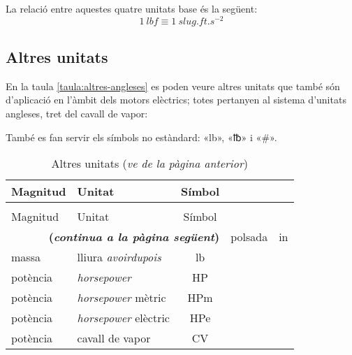 La relació entre aquestes quatre unitats base és la següent:
\begin{equation}
    \qty{1}{lbf} \equiv \qty{1}{slug.ft.s^{-2}}
\end{equation}

\subsection{Altres unitats}

En la taula \vref{taula:altres-angleses} es poden veure altres unitats que també són d'aplicació en l'àmbit dels motors elèctrics; totes pertanyen al sistema d'unitats angleses, tret del cavall de vapor:
\begin{ThreePartTable}
	\begin{TableNotes}
		\item[\color{blue}(a)] {\footnotesize També es fan servir els símbols no estàndard: «lb», «℔» i  «\#».}
	\end{TableNotes}
	\begin{longtable}[h]{llc}
		\caption{\label{taula:altres-angleses}Altres unitats}\\
		\toprule[1pt]
		Magnitud & Unitat & Símbol \\
		\midrule
		\endfirsthead
		\caption[]{Altres unitats (\emph{ve de la pàgina anterior})}\\
		\toprule[1pt]
		Magnitud & Unitat & Símbol \\
		\midrule
		\endhead
		\midrule
		\multicolumn{3}{r}{\sffamily\bfseries\color{NavyBlue}(\emph{continua a la pàgina següent})}
		\endfoot
		\insertTableNotes
		\endlastfoot
		longitud & polsada & in \\
		massa & lliura \textit{avoirdupois} & lb\tnote{\color{blue}(a)} \\
		potència & \textit{horsepower} & HP \\
		potència & \textit{horsepower} mètric & \unit{HPm} \\
		potència & \textit{horsepower} elèctric & \unit{HPe} \\
		potència & cavall de vapor & CV \\
		\bottomrule[1pt]
	\end{longtable}
\end{ThreePartTable}
 


